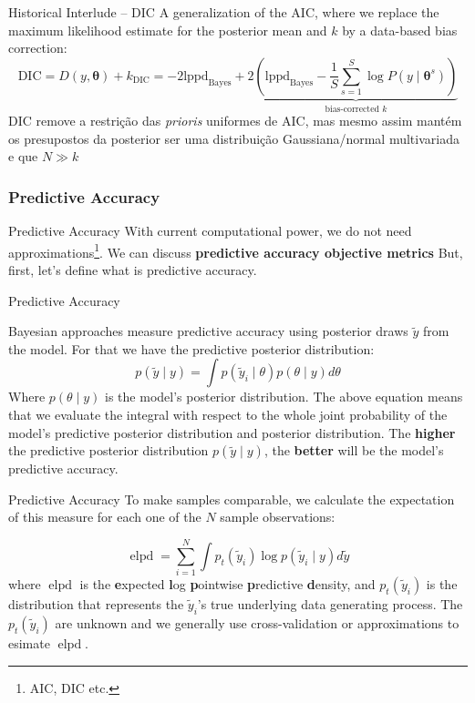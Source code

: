 \begin{frame}{Historical Interlude -- DIC \parencite{spiegelhalter2002bayesian}}
	A generalization of the AIC,
	where we replace the maximum likelihood estimate for the posterior mean
	and $k$ by a data-based bias correction:
	$$
		\text{DIC} = D(y, \boldsymbol{\theta}) + k_{\text{DIC}} = -2 \text{lppd}_{\text{Bayes}}
		+2 \underbrace{\left( \text{lppd}_{\text{Bayes}} - \frac{1}{S} \sum^S_{s=1} \log P(y \mid \boldsymbol{\theta}^s) \right)}_{\text{bias-corrected $k$}}
	$$
	DIC remove a restrição das \textit{prioris} uniformes de AIC, mas mesmo assim
	mantém os presupostos da posterior ser uma distribuição Gaussiana/normal multivariada
	e que $N \gg k$
\end{frame}

\subsubsection{Predictive Accuracy}
\begin{frame}{Predictive Accuracy}
	With current computational power, we do not need approximations\footnote{AIC, DIC etc.}.
	\vfill
	We can discuss \textbf{predictive accuracy objective metrics}
	\vfill
	But, first, let's define what is predictive accuracy.
\end{frame}

\begin{frame}{Predictive Accuracy}
	\begin{defn}
		Bayesian approaches measure predictive accuracy using posterior draws
		$\tilde{y}$ from the model.
		For that we have the predictive posterior distribution:
		$$
			p(\tilde{y} \mid y) = \int p(\tilde{y}_i \mid \theta) p(\theta \mid y) d \theta
		$$
		\small
		Where $p(\theta \mid y)$ is the model's posterior distribution.
		The above equation means that we evaluate the integral
		with respect to the whole joint probability of the model's
		predictive posterior distribution and posterior distribution.
		\vfill
		\normalsize
		The \textbf{higher} the predictive posterior distribution
		$p(\tilde{y} \mid y)$,
		the \textbf{better} will be the model's predictive accuracy.
	\end{defn}
\end{frame}

\begin{frame}{Predictive Accuracy}
	To make samples comparable,
	we calculate the expectation of this measure for each one of the $N$ sample observations:

	$$
		\operatorname{elpd} = \sum_{i=1}^N \int p_t(\tilde{y}_i) \log p(\tilde{y}_i \mid y) d \tilde{y}
	$$
	where $\operatorname{elpd}$ is the \textbf{e}xpected \textbf{l}og \textbf{p}ointwise \textbf{p}redictive \textbf{d}ensity,
	and $p_t(\tilde{y}_i)$ is the distribution that represents the
	$\tilde{y}_i$'s true underlying data generating process.
	The $p_t(\tilde{y}_i)$ are unknown and we generally use
	cross-validation or approximations to esimate $\operatorname{elpd}$.
\end{frame}

